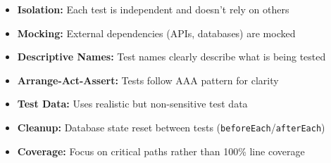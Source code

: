 \begin{itemize}
    \item \textbf{Isolation:} Each test is independent and doesn't rely on others
    \item \textbf{Mocking:} External dependencies (APIs, databases) are mocked
    \item \textbf{Descriptive Names:} Test names clearly describe what is being tested
    \item \textbf{Arrange-Act-Assert:} Tests follow AAA pattern for clarity
    \item \textbf{Test Data:} Uses realistic but non-sensitive test data
    \item \textbf{Cleanup:} Database state reset between tests (\texttt{beforeEach}/\texttt{afterEach})
    \item \textbf{Coverage:} Focus on critical paths rather than 100\% line coverage
\end{itemize}
